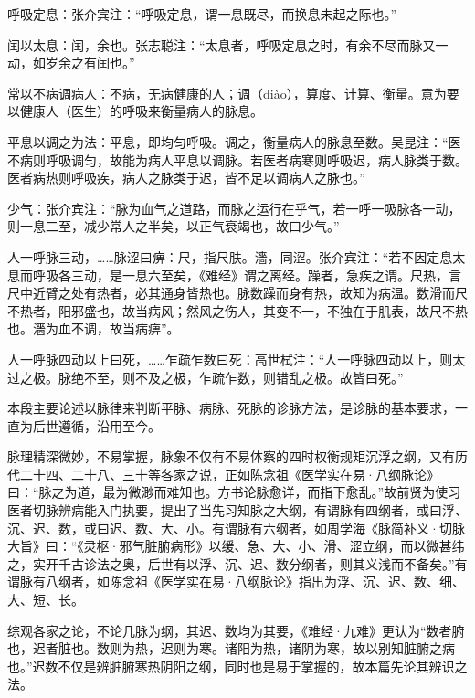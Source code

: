\documentclass[12pt]{ctexbook}
\begin{document}
\begin{jiaozhu}
	\item 呼吸定息：张介宾注：“呼吸定息，谓一息既尽，而换息未起之际也。”
	\item 闰以太息：闰，余也。张志聪注：“太息者，呼吸定息之时，有余不尽而脉又一动，如岁余之有闰也。”
	\item 常以不病调病人：不病，无病健康的人；调（diào），算度、计算、衡量。意为要以健康人（医生）的呼吸来衡量病人的脉息。
	\item 平息以调之为法：平息，即均匀呼吸。调之，衡量病人的脉息至数。吴昆注：“医不病则呼吸调匀，故能为病人平息以调脉。若医者病寒则呼吸迟，病人脉类于数。医者病热则呼吸疾，病人之脉类于迟，皆不足以调病人之脉也。”
	\item 少气：张介宾注：“脉为血气之道路，而脉之运行在乎气，若一呼一吸脉各一动，则一息二至，减少常人之半矣，以正气衰竭也，故曰少气。”
	\item 人一呼脉三动，……脉涩曰痹：尺，指尺肤。濇，同涩。张介宾注：“若不因定息太息而呼吸各三动，是一息六至矣，《难经》谓之离经。躁者，急疾之谓。尺热，言尺中近臂之处有热者，必其通身皆热也。脉数躁而身有热，故知为病温。数滑而尺不热者，阳邪盛也，故当病风；然风之伤人，其变不一，不独在于肌表，故尺不热也。濇为血不调，故当病痹”。
	\item 人一呼脉四动以上曰死，……乍疏乍数曰死：高世栻注：“人一呼脉四动以上，则太过之极。脉绝不至，则不及之极，乍疏乍数，则错乱之极。故皆曰死。”
\end{jiaozhu}



本段主要论述以脉律来判断平脉、病脉、死脉的诊脉方法，是诊脉的基本要求，一直为后世遵循，沿用至今。

脉理精深微妙，不易掌握，脉象不仅有不易体察的四时权衡规矩沉浮之纲，又有历代二十四、二十八、三十等各家之说，正如陈念祖《医学实在易·八纲脉论》曰：“脉之为道，最为微渺而难知也。方书论脉愈详，而指下愈乱。”故前贤为使习医者切脉辨病能入门执要，提出了当先习知脉之大纲，有谓脉有四纲者，或曰浮、沉、迟、数，或曰迟、数、大、小。有谓脉有六纲者，如周学海《脉简补义·切脉大旨》曰：“《灵枢·邪气脏腑病形》以缓、急、大、小、滑、涩立纲，而以微甚纬之，实开千古诊法之奥，后世有以浮、沉、迟、数分纲者，则其义浅而不备矣。”有谓脉有八纲者，如陈念祖《医学实在易·八纲脉论》指出为浮、沉、迟、数、细、大、短、长。

综观各家之论，不论几脉为纲，其迟、数均为其要，《难经·九难》更认为“数者腑也，迟者脏也。数则为热，迟则为寒。诸阳为热，诸阴为寒，故以别知脏腑之病也。”迟数不仅是辨脏腑寒热阴阳之纲，同时也是易于掌握的，故本篇先论其辨识之法。
\end{document}
